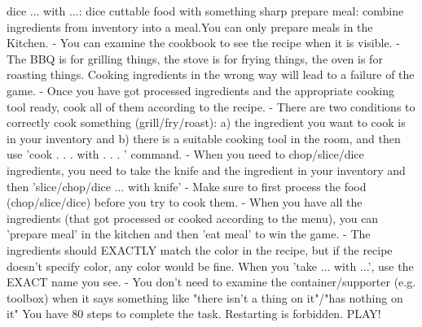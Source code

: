 {dice ... with ...: dice cuttable food with something sharp \newline
prepare meal: combine ingredients from inventory into a meal.\newline\newline You can only prepare meals in the Kitchen.\newline
- You can examine the cookbook to see the recipe when it is visible. \newline
- The BBQ is for grilling things, the stove is for frying things, the oven is for roasting things. Cooking ingredients in the wrong way will lead to a failure of the game. \newline
- Once you have got processed ingredients and the appropriate cooking tool ready, cook all of them according to the recipe. \newline
- There are two conditions to correctly cook something (grill/fry/roast): \newline
a) the ingredient you want to cook is in your inventory and \newline
b) there is a suitable cooking tool in the room, and then use 'cook . . . with . . . ' command. \newline
- When you need to chop/slice/dice ingredients, you need to take the knife and the ingredient in your inventory and then 'slice/chop/dice ... with knife' \newline
- Make sure to first process the food (chop/slice/dice) before you try to cook them. \newline
- When you have all the ingredients (that got processed or cooked according to the menu), you can 'prepare meal'
in the kitchen and then 'eat meal' to win the game. \newline
- The ingredients should EXACTLY match the color in the recipe, but if the recipe doesn't specify color, any color would be fine. When you 'take ... with ...', use the EXACT name you see. \newline
- You don't need to examine the container/supporter (e.g. toolbox) when it says something like "there isn't a thing on it"/"has nothing on it"\newline\newline
You have 80 steps to complete the task. Restarting is forbidden.
\newline\newline
PLAY!
}






